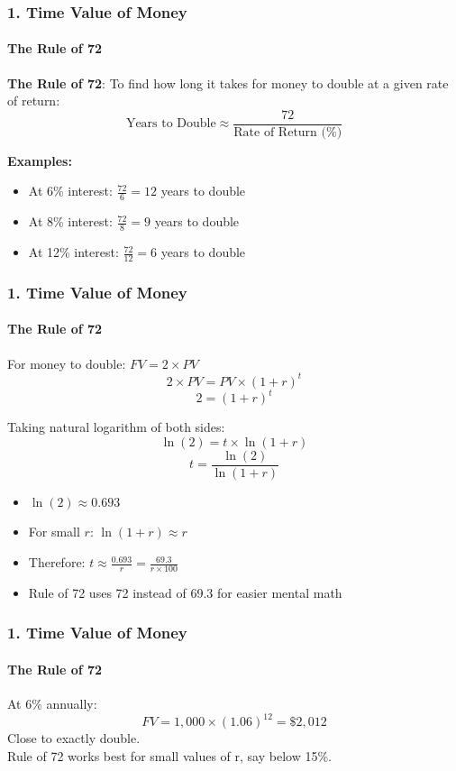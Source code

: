 \documentclass{beamer}
\begin{document}
\begin{foundframe}[t]
    \frametitle{1. Time Value of Money}
    \framesubtitle{The Rule of 72}

    \textbf{The Rule of 72}: To find how long it takes for money to double at a given rate of return:
    $$\text{Years to Double} \approx \frac{72}{\text{Rate of Return (\%)}}$$
 

    \textbf{Examples:}
    \begin{itemize}
        \item At 6\% interest: $\frac{72}{6} = 12$ years to double
        \item At 8\% interest: $\frac{72}{8} = 9$ years to double
        \item At 12\% interest: $\frac{72}{12} = 6$ years to double
    \end{itemize}
    \vspace{1em}

\end{foundframe}

\begin{foundframe}[t]
    \frametitle{1. Time Value of Money}
    \framesubtitle{The Rule of 72}

    For money to double: $FV = 2 \times PV$
    $$2 \times PV = PV \times (1 + r)^t$$
    $$2 = (1 + r)^t$$

    Taking natural logarithm of both sides:
    $$\ln(2) = t \times \ln(1 + r)$$
    $$t = \frac{\ln(2)}{\ln(1 + r)}$$

    \begin{itemize}
        \item $\ln(2) \approx 0.693$
        \item For small $r$: $\ln(1 + r) \approx r$
        \item Therefore: $t \approx \frac{0.693}{r} = \frac{69.3}{r \times 100}$
        \item Rule of 72 uses 72 instead of 69.3 for easier mental math
    \end{itemize}

\end{foundframe}

\begin{foundframe}[t]
    \frametitle{1. Time Value of Money}
    \framesubtitle{The Rule of 72}

    At 6\% annually:
    $$FV = 1,000 \times (1.06)^{12} = \$2,012$$
    Close to exactly double.\\
    \vspace{1em}
    Rule of 72 works best for small values of r, say below 15\%.

\end{foundframe}
\end{document}
